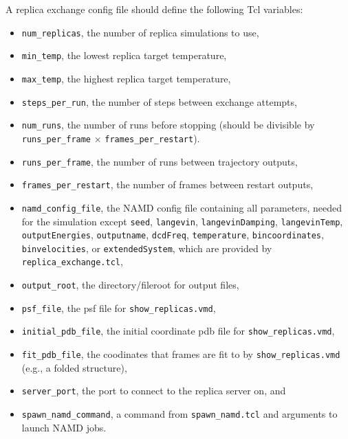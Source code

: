 A replica exchange config file should define the following Tcl variables:
\begin{itemize}
\item {\tt num\_replicas}, the number of replica simulations to use,
\item {\tt min\_temp}, the lowest replica target temperature,
\item {\tt max\_temp}, the highest replica target temperature,
\item {\tt steps\_per\_run}, the number of steps between exchange attempts,
\item {\tt num\_runs}, the number of runs before stopping
(should be divisible by {\tt runs\_per\_frame} $\times$ {\tt frames\_per\_restart}).
\item {\tt runs\_per\_frame}, the number of runs between trajectory outputs,
\item {\tt frames\_per\_restart}, the number of frames between restart outputs,

\item {\tt namd\_config\_file}, the NAMD config file containing all parameters,
needed for the simulation except {\tt seed}, {\tt langevin}, 
{\tt langevinDamping}, {\tt langevinTemp}, {\tt outputEnergies},
{\tt outputname}, {\tt dcdFreq},
{\tt temperature}, {\tt bincoordinates}, {\tt binvelocities},
or {\tt extendedSystem}, which are provided by {\tt replica\_exchange.tcl},

\item {\tt output\_root}, the directory/fileroot for output files,

\item {\tt psf\_file}, the psf file for {\tt show\_replicas.vmd}, 
\item {\tt initial\_pdb\_file}, the initial coordinate pdb file for {\tt show\_replicas.vmd},
\item {\tt fit\_pdb\_file}, the coodinates that frames are fit to by {\tt show\_replicas.vmd} (e.g., a folded structure),
\item {\tt server\_port}, the port to connect to the replica server on, and
\item {\tt spawn\_namd\_command}, a command from {\tt spawn\_namd.tcl} and arguments to launch NAMD jobs.
\end{itemize}

